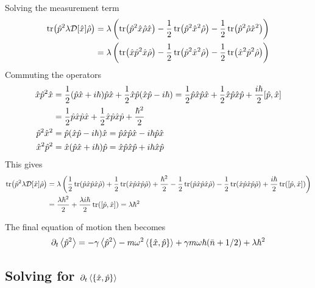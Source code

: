Solving the measurement term
\begin{align}
    \tr(\hat{p}^2 \lambda \mathcal{D}[\hat{x}] \hat{\rho}) &= \lambda \left( \tr(\hat{p}^2 \hat{x} \hat{\rho} \hat{x}) - \frac{1}{2}\tr(\hat{p}^2 \hat{x}^2 \hat{\rho}) - \frac{1}{2} \tr(\hat{p}^2 \hat{\rho} \hat{x}^2) \right)\\
    &= \lambda \left( \tr(\hat{x} \hat{p}^2 \hat{x} \hat{\rho}) - \frac{1}{2} \tr(\hat{p}^2 \hat{x}^2 \hat{\rho}) - \frac{1}{2} \tr(\hat{x}^2 \hat{p}^2 \hat{\rho}) \right)
\end{align}
Commuting the operators
\begin{align}
    \xop \pop^2 \xop &= \frac{1}{2}(\pop\xop + i\hbar)\pop\xop + \frac{1}{2}\xop\pop(\xop\pop -i\hbar) = \frac{1}{2}\pop\xop\pop\xop + \frac{1}{2} \xop\pop\xop\pop + \frac{i\hbar}{2} \comm{\pop}{\xop}\\
    &=\frac{1}{2}\pop\xop\pop\xop + \frac{1}{2} \xop\pop\xop\pop +\frac{\hbar^2}{2}\\
    \pop^2 \xop^2 &= \pop (\xop\pop -i\hbar)\xop = \pop\xop\pop\xop - i\hbar \pop\xop\\
    \xop^2 \pop^2 &= \xop(\pop\xop + i\hbar)\pop = \xop\pop\xop\pop + i\hbar \xop\pop
\end{align}
This gives 
\begin{align}
    \tr(\pop^2 \lambda \super{\xop} \dmatrix) &= \lambda \left(  \frac{1}{2}\tr(\pop\xop\pop\xop \dmatrix) + \frac{1}{2} \tr(\xop\pop\xop\pop\dmatrix) + \frac{\hbar^2}{2} -\frac{1}{2}\tr(\pop\xop\pop\xop \dmatrix) - \frac{1}{2} \tr(\xop\pop\xop\pop\dmatrix) + \frac{i\hbar}{2}\tr(\comm{\pop}{\xop}) \right)\\
    &= \frac{\lambda \hbar^2}{2} + \frac{\lambda i \hbar}{2} \tr(\comm{\pop}{\xop}) = \lambda \hbar^2
\end{align}

The final equation of motion then becomes
\begin{equation}
    \dt\expval{\pop^2} = -\gamma \expval{\pop^2} - m\omega^2 \expval{\acomm{\xop}{\pop}} + \gamma m \omega\hbar (\nbar + 1/2) + \lambda \hbar^2
\end{equation}

\subsection{Solving for $\dt\expval{\acomm{\xop}{\pop}}$}